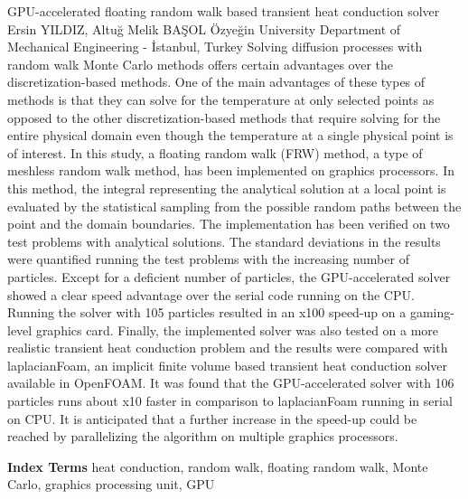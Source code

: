 
    \begin{abstract_online}{GPU-accelerated floating random walk based transient heat conduction solver}{%
        Ersin YILDIZ, Altuğ Melik BAŞOL}{%
        }{%
        Özyeğin University Department of Mechanical Engineering - İstanbul, Turkey}
    Solving diffusion processes with random walk Monte Carlo methods offers certain advantages over the discretization-based methods. One of the main advantages of these types of methods is that they can solve for the temperature at only selected points as opposed to the other discretization-based methods that require solving for the entire physical domain even though the temperature at a single physical point is of interest. In this study, a floating random walk (FRW) method, a type of meshless random walk method, has been implemented on graphics processors. In this method, the integral representing the analytical solution at a local point is evaluated by the statistical sampling from the possible random paths between the point and the domain boundaries. The implementation has been verified on two test problems with analytical solutions. The standard deviations in the results were quantified running the test problems with the increasing number of particles. Except for a deficient number of particles, the GPU-accelerated solver showed a clear speed advantage over the serial code running on the CPU. Running the solver with 105 particles resulted in an x100 speed-up on a gaming-level graphics card. Finally, the implemented solver was also tested on a more realistic transient heat conduction problem and the results were compared with laplacianFoam, an implicit finite volume based transient heat conduction solver available in OpenFOAM. It was found that the GPU-accelerated solver with 106 particles runs about x10 faster in comparison to laplacianFoam running in serial on CPU. It is anticipated that a further increase in the speed-up could be reached by parallelizing the algorithm on multiple graphics processors. 
    
            \textbf{Index Terms} \newline{}heat conduction, random walk, floating random walk, Monte Carlo, graphics processing unit, GPU
    \end{abstract_online}
    